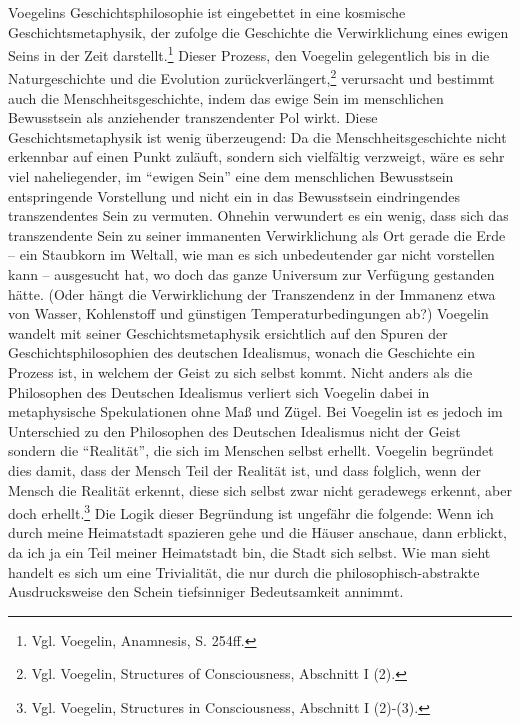 Voegelins Geschichtsphilosophie ist eingebettet in eine kosmische
Geschichtsmetaphysik, der zufolge die Geschichte die Verwirklichung eines
ewigen Seins in der Zeit darstellt.\footnote{Vgl. Voegelin, Anamnesis, S.
  254ff.} Dieser Prozess, den Voegelin gelegentlich bis in die Naturgeschichte
und die Evolution zurückverlängert,\footnote{Vgl. Voegelin, Structures of
  Consciousness, Abschnitt I (2).} verursacht und bestimmt auch die
Menschheitsgeschichte, indem das ewige Sein im menschlichen Bewusstsein als
anziehender transzendenter Pol wirkt. Diese Geschichtsmetaphysik ist wenig
überzeugend: Da die Menschheitsgeschichte nicht erkennbar auf einen Punkt
zuläuft, sondern sich vielfältig verzweigt, wäre es sehr viel naheliegender,
im "`ewigen Sein"' eine dem menschlichen Bewusstsein entspringende Vorstellung
und nicht ein in das Bewusstsein eindringendes transzendentes Sein zu
vermuten. Ohnehin verwundert es ein wenig, dass sich das transzendente Sein zu
seiner immanenten Verwirklichung als Ort gerade die Erde -- ein Staubkorn im
Weltall, wie man es sich unbedeutender gar nicht vorstellen kann -- ausgesucht
hat, wo doch das ganze Universum zur Verfügung gestanden hätte. (Oder hängt
die Verwirklichung der Transzendenz in der Immanenz etwa von Wasser,
Kohlenstoff und günstigen Temperaturbedingungen ab?)  Voegelin wandelt mit
seiner Geschichtsmetaphysik ersichtlich auf den Spuren der
Geschichtsphilosophien des deutschen Idealismus, wonach die Geschichte ein
Prozess ist, in welchem der Geist zu sich selbst kommt.  Nicht anders als die
Philosophen des Deutschen Idealismus verliert sich Voegelin dabei in
metaphysische Spekulationen ohne Maß und Zügel. Bei Voegelin ist es jedoch im
Unterschied zu den Philosophen des Deutschen Idealismus nicht der Geist
sondern die "`Realität"', die sich im Menschen selbst erhellt.  Voegelin
begründet dies damit, dass der Mensch Teil der Realität ist, und dass
folglich, wenn der Mensch die Realität erkennt, diese sich selbst zwar nicht
geradewegs erkennt, aber doch erhellt.\footnote{Vgl.  Voegelin, Structures in
  Consciousness, Abschnitt I (2)-(3).} Die Logik dieser Begründung ist
ungefähr die folgende: Wenn ich durch meine Heimatstadt spazieren gehe und die
Häuser anschaue, dann erblickt, da ich ja ein Teil meiner Heimatstadt bin, die
Stadt sich selbst. Wie man sieht handelt es sich um eine Trivialität, die nur
durch die philosophisch-abstrakte Ausdrucksweise den Schein tiefsinniger
Bedeutsamkeit annimmt.

